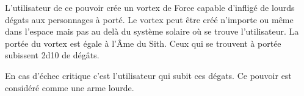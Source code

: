 \begin{description}[align=left]
        L'utilisateur de ce pouvoir crée un vortex de Force capable d'infligé de lourds dégats aux personnages à porté. Le vortex peut être créé n'importe ou même dans l'espace mais pas au delà du système solaire où se trouve l'utilisateur. La portée du vortex est égale à l'\^Ame du Sith. Ceux qui se trouvent à portée subissent 2d10 de dégâts.

        En cas d'échec critique c'est l'utilisateur qui subit ces dégats. Ce pouvoir est considéré comme une arme lourde.
        \\

\end{description}